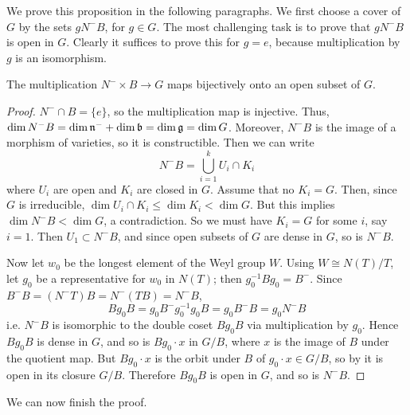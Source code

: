 We prove this proposition in the following paragraphs. We first choose a cover of $G$ by the sets $g N^{-} B$, for 
$g \in G$.
The most challenging task is to prove that $g N^{-}B$ is open in $G$. Clearly it suffices to prove this for $g=e$,
because multiplication by $g$ is an isomorphism.

\begin{lemma}
The multiplication $N^- \times B \to G$ maps bijectively onto an open subset of $G$. 
\end{lemma}
\begin{proof}
$N^- \cap B = \{e\}$, so the multiplication map is injective. Thus, $\dim N^-B = \dim \mathfrak n^- + \dim \mathfrak b
= \dim \mathfrak g = \dim G$. Moreover, $N^- B$ is the image of a morphism of varieties, so it is constructible.  Then we can write
\[	N^-B = \bigcup_{i=1}^k U_i \cap K_i	\]
where $U_i$ are open and $K_i$ are closed in $G$. Assume that no $K_i = G$. Then, since $G$ is irreducible, $\dim U_i \cap
K_i \leq \dim K_i < \dim G$.  But this implies $\dim N^-B < \dim G$, a 
contradiction. So we must have $K_i = G$ for some $i$, say $i=1$. Then $U_1 \subset N^-B$, 
and since open subsets of $G$ are dense in $G$, so is $N^-B$.

Now let $w_0$ be the longest element of the Weyl group $W$. Using $W \cong N(T)/T$, let $g_0$ be a representative
for $w_0$ in $N(T)$; then $g_0^{-1} B g_0 =B^-$. Since $B^- B = (N^- T)B = N^-(TB) = N^- B$,
\[	Bg_0B = g_0 B^- g_0^{-1} g_0 B = g_0 B^- B = g_0 N^- B	\]
i.e. $N^- B$ is isomorphic to the double coset $Bg_0 B$ via multiplication by $g_0$. Hence $Bg_0 B$ is dense in $G$,
and so is $B g_0 \cdot x$ in $G/B$, where $x$ is the image of $B$ under the quotient map. But $B g_0 \cdot x$ is
the orbit under $B$ of $g_0 \cdot x \in G/B$, so by  it is open in its closure
$G/B$. Therefore $Bg_0 B$ is open in $G$, and so is $N^- B$.
\end{proof}

We can now finish the proof.

